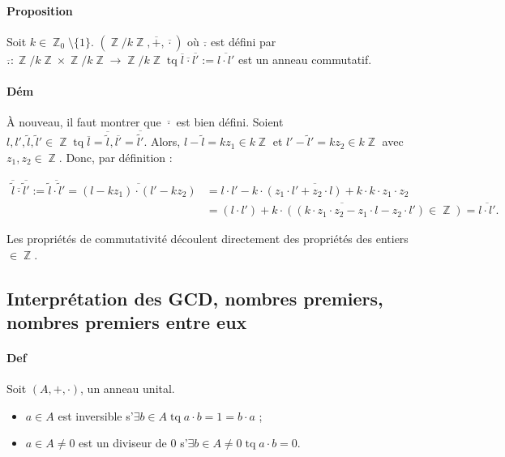 \documentclass{article}
\DeclareMathOperator{\tq}{\text{ tq }}
\DeclareMathOperator{\Z}{\mathbb Z}
\begin{document}
			\paragraph{Proposition} Soit $k \in \Z_0 \setminus \{1\}$. $(\Z/k\Z, \overline{+}, \overline{\cdot})$ où $\overline{.}$ est défini par
			$\overline{.} : \Z/k\Z \times \Z/k\Z \to \Z/k\Z \tq \overline{l} \overline{\cdot} \overline{l'} := \overline{l \cdot l'}$ est un anneau commutatif.

			\paragraph{Dém} À nouveau, il faut montrer que $\overline{\cdot}$ est bien défini.
			Soient $l, l', \widetilde{l}, \widetilde{l}' \in \Z \tq \overline{l} = \overline{\widetilde{l}}, \overline{l'} = \overline{\widetilde{l'}}$.
			Alors, $l - \widetilde{l} = kz_1 \in k\Z$ et $l' - \widetilde{l}' = kz_2 \in k\Z$ avec $z_1, z_2 \in \Z$. Donc, par définition :

			\[\begin{aligned}
				\overline{\widetilde{l}} \overline{\cdot} \overline{\widetilde{l}'} := \overline{\widetilde{l} \cdot \widetilde{l}'}
				= \overline{(l - kz_1) \cdot (l' - kz_2)} &= \overline{l \cdot  l' - k \cdot (z_1 \cdot l' + z_2 \cdot l) + k \cdot k \cdot z_1 \cdot z_2} \\
				&= \overline{(l \cdot l') + k \cdot ((k \cdot z_1 \cdot z_2 - z_1 \cdot l - z_2 \cdot l') \in \Z)} = \overline{l \cdot l'}.
			\end{aligned}\]

			Les propriétés de commutativité découlent directement des propriétés des entiers $\in \Z$.

		\subsection{Interprétation des GCD, nombres premiers, nombres premiers entre eux}

			\paragraph{Def} Soit $(A, +, \cdot)$, un anneau unital.
			\begin{itemize}
				\item $a \in A$ est inversible s'$\exists b \in A \tq a \cdot b = 1 = b \cdot a$ ;
				\item $a \in A \neq 0$ est un diviseur de 0 s'$\exists b \in A \neq 0 \tq a \cdot b = 0$.
			\end{itemize}
\end{document}
